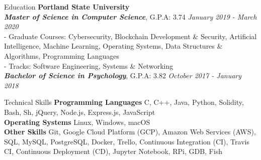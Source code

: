 \documentclass{resume} %
\begin{document}
\begin{rSection}{Education}
{\bf Portland State University} 
  \\{\bf {\em Master of Science in Computer Science}}, { G.P.A: 3.74 }\hfill {\em January 2019 - March 2020}
  \\{ \small{ \hspace{10mm} - Graduate Courses:}} {\small{Cybersecurity, Blockchain Development \& Security, Artificial Intelligence, Machine Learning, Operating Systems, Data Structures \& Algorithms, Programming Languages}}
  \\{ \small{ \hspace{10mm} - Tracks:}} {\small{Software Engineering, Systems \& Networking}}
  \\ {\bf \em Bachelor of Science in Psychology}, { G.P.A: 3.82 }\hfill {\em October 2017 - January 2018}  


\end{rSection}


\begin{rSection}{Technical Skills}
  {\bf{Programming Languages}} C, C++, Java, Python, Solidity, Bash, Sh, jQuery, Node.js, Express.js, JavaScript\\
  {\bf{Operating Systems}} Linux, Windows, macOS\\
  {\bf{Other Skills}} Git, Google Cloud Platform (GCP), Amazon Web Services (AWS), SQL, MySQL, PostgreSQL, Docker, Trello, Continuous Integration (CI), Travis CI, Continuous Deployment (CD), Jupyter Notebook, RPi, GDB, Fish

\end{rSection}
\end{document}
